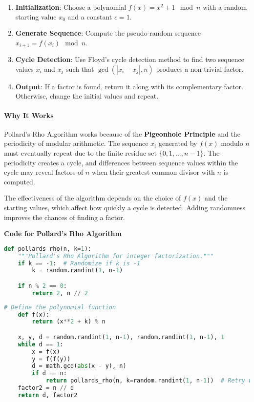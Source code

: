 \documentclass[12pt]{report}
\begin{document}
\begin{enumerate}
    \item \textbf{Initialization}: Choose a polynomial $f(x) = x^2 + 1 \mod n$ with a random starting value $x_0$ and a constant $c = 1$.
    \item \textbf{Generate Sequence}: Compute the pseudo-random sequence $x_{i+1} = f(x_i) \mod n$.
    \item \textbf{Cycle Detection}: Use Floyd's cycle detection method to find two sequence values $x_i$ and $x_j$ such that $\gcd(|x_i - x_j|, n)$ produces a non-trivial factor.
    \item \textbf{Output}: If a factor is found, return it along with its complementary factor. Otherwise, change the initial values and repeat.
\end{enumerate}

\paragraph{Why It Works}

Pollard's Rho Algorithm works because of the \textbf{Pigeonhole Principle} and the periodicity of modular arithmetic. The sequence $x_i$ generated by $f(x)$ modulo $n$ must eventually repeat due to the finite residue set $\{0, 1, \ldots, n-1\}$. The periodicity creates a cycle, and differences between sequence values within the cycle may reveal factors of $n$ when their greatest common divisor with $n$ is computed.

The effectiveness of the algorithm depends on the choice of $f(x)$ and the starting values, which affect how quickly a cycle is detected. Adding randomness improves the chances of finding a factor.
\begin{center}
    \item \textbf{Code for Pollard's Rho Algorithm}
\end{center}

\begin{lstlisting}[language=Python]
def pollards_rho(n, k=1):
    """Pollard's Rho Algorithm for integer factorization."""
    if k == -1:  # Randomize if k is -1
        k = random.randint(1, n-1)

    if n % 2 == 0:
        return 2, n // 2
\end{lstlisting}

\begin{lstlisting}[language=Python]
    # Define the polynomial function
    def f(x):
        return (x**2 + k) % n

    x, y, d = random.randint(1, n-1), random.randint(1, n-1), 1
    while d == 1:
        x = f(x)
        y = f(f(y))
        d = math.gcd(abs(x - y), n)
        if d == n:
            return pollards_rho(n, k=random.randint(1, n-1))  # Retry with new parameters
    factor2 = n // d
    return d, factor2
\end{lstlisting}
\end{document}
